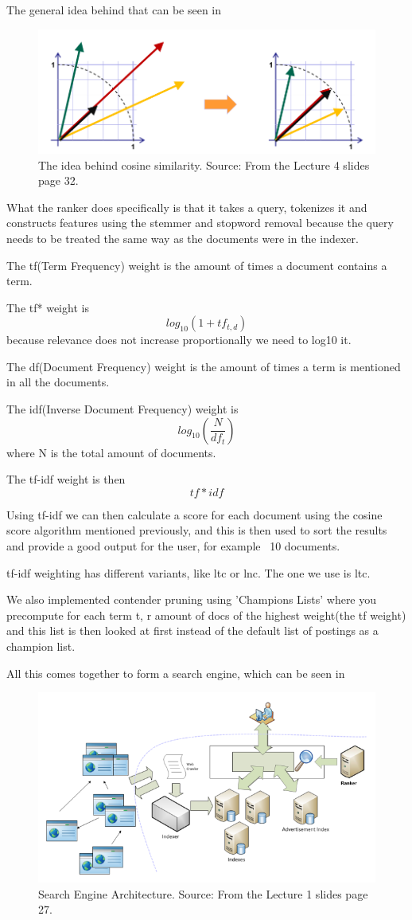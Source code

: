 	The general idea behind that can be seen in 
	
	\begin{figure}[H]
	\centering
	\includegraphics[width=0.7\linewidth]{Media/CosineSimilarity}
	\caption{The idea behind cosine similarity. Source: From the Lecture 4 slides page 32.}
	\label{fig:CosineSimilarity}
	\end{figure}
	
	What the ranker does specifically is that it takes a query, tokenizes it and constructs features using the stemmer and stopword removal because the query needs to be treated the same way as the documents were in the indexer.
	
	The tf(Term Frequency) weight is the amount of times a document contains a term.
	
	The tf* weight is $$log_{10}(1+tf_{t,d})$$ because relevance does not increase proportionally we need to log10 it.
	
	The df(Document Frequency) weight is the amount of times a term is mentioned in all the documents.
	
	The idf(Inverse Document Frequency) weight is $$log_{10}(\frac{N}{df_{t}})$$ where N is the total amount of documents.
	
	The tf-idf weight is then $$tf*idf$$
	
	Using tf-idf we can then calculate a score for each document using the cosine score algorithm mentioned previously, and this is then used to sort the results and provide a good output for the user, for example ~10 documents.
	
	tf-idf weighting has different variants, like ltc or lnc. The one we use is ltc.
	
	We also implemented contender pruning using 'Champions Lists' where you precompute for each term t, r amount of docs of the highest weight(the tf weight) and this list is then looked at first instead of the default list of postings as a champion list.
	
	All this comes together to form a search engine, which can be seen in 
	
	\begin{figure}[H]
	\centering
	\includegraphics[width=0.7\linewidth]{Media/searchenginearchitecture}
	\caption{Search Engine Architecture. Source: From the Lecture 1 slides page 27.}
	\label{fig:searchenginearchitecture}
	\end{figure}


